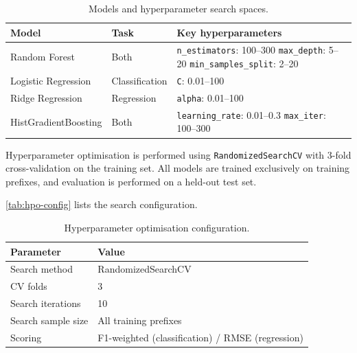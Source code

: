\documentclass[runningheads]{llncs}
\begin{document}
\begin{table}[H]
    \centering
    \caption{Models and hyperparameter search spaces.}
    \label{tab:models}
    \begin{tabularx}{\textwidth}{llX}
        \toprule
        Model & Task & Key hyperparameters \\
        \midrule
        Random Forest & Both &
            \texttt{n\_estimators}: 100--300\newline
            \texttt{max\_depth}: 5--20\newline
            \texttt{min\_samples\_split}: 2--20 \\
        Logistic Regression & Classification & \texttt{C}: 0.01--100 \\
        Ridge Regression & Regression & \texttt{alpha}: 0.01--100 \\
        HistGradientBoosting & Both &
            \texttt{learning\_rate}: 0.01--0.3\newline
            \texttt{max\_iter}: 100--300 \\
        \bottomrule
    \end{tabularx}
\end{table}

Hyperparameter optimisation is performed using \texttt{RandomizedSearchCV}
with 3-fold cross-validation on the training set. All models
are trained exclusively on training prefixes, and evaluation is performed on a
held-out test set.

\autoref{tab:hpo-config} lists the search configuration.

\begin{table}[H]
    \centering
    \caption{Hyperparameter optimisation configuration.}
    \label{tab:hpo-config}
    \begin{tabularx}{0.7\textwidth}{lX}
        \toprule
        Parameter & Value \\
        \midrule
        Search method & RandomizedSearchCV \\
        CV folds & 3 \\
        Search iterations & 10 \\
        Search sample size & All training prefixes \\
        Scoring & F1-weighted (classification) / RMSE (regression) \\ %
        \bottomrule
    \end{tabularx}
\end{table}
\end{document}
